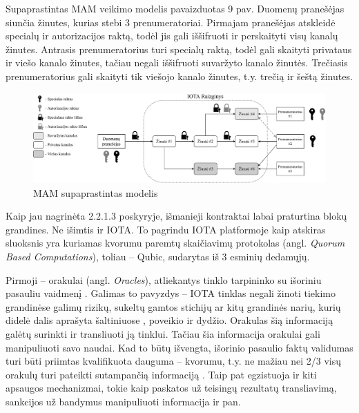 Supaprastintas MAM veikimo modelis pavaizduotas 9 pav. Duomenų pranešėjas siunčia žinutes, kurias stebi 3 prenumeratoriai. Pirmajam pranešėjas atskleidė specialų ir autorizacijos raktą, todėl jis gali iššifruoti ir perskaityti visų kanalų žinutes. Antrasis prenumeratorius turi specialų raktą, todėl gali skaityti privataus ir viešo kanalo žinutes, tačiau negali iššifruoti suvaržyto kanalo žinutės. Trečiasis prenumeratorius gali skaityti tik viešojo kanalo žinutes, t.y. trečią ir šeštą žinutes.

\begin{figure}[H]
    \centering
    \includegraphics[scale=0.51]{images/mam-example}
    \caption{MAM supaprastintas modelis}
\end{figure}





Kaip jau nagrinėta 2.2.1.3 poskyryje, išmanieji kontraktai labai praturtina blokų grandines. Ne išimtis ir IOTA. To pagrindu IOTA platformoje kaip atskiras sluoksnis yra kuriamas kvorumu paremtų skaičiavimų protokolas (angl. \textit{Quorum Based Computations}), toliau – Qubic, sudarytas iš 3 esminių dedamųjų.

Pirmoji – orakulai (angl. \textit{Oracles}), atliekantys tinklo tarpininko su išoriniu pasauliu vaidmenį \cite{iota2017oracles}. Galimas to pavyzdys – IOTA tinklas negali žinoti tiekimo grandinėse galimų rizikų, sukeltų gamtos stichijų ar kitų grandinės narių, kurių didelė dalis aprašyta šaltiniuose \cite{behdani2012handle, strom2013pwc}, poveikio ir dydžio. Orakulas šią informaciją galėtų surinkti ir transliuoti ją tinklui. Tačiau šia informacija orakulai gali manipuliuoti savo naudai. Kad to būtų išvengta, išorinio pasaulio faktų validumas turi būti priimtas kvalifikuota dauguma – kvorumu, t.y. ne mažiau nei 2/3 visų orakulų turi pateikti sutampančią informaciją \cite{iota2017oracles}. Taip pat egzistuoja ir kiti apsaugos mechanizmai, tokie kaip paskatos už teisingų rezultatų transliavimą, sankcijos už bandymus manipuliuoti informacija ir pan.

